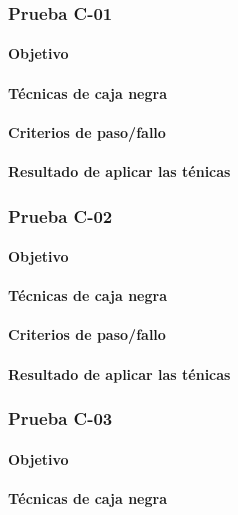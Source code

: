 \documentclass[10pt,a4paper]{article}
\begin{document}
			\subsubsection{Prueba C-01}
			\paragraph{Objetivo}
			\paragraph{Técnicas de caja negra}
			\paragraph{Criterios de paso/fallo}
			\paragraph{Resultado de aplicar las ténicas}
			\subsubsection{Prueba C-02}
			\paragraph{Objetivo}
			\paragraph{Técnicas de caja negra}
			\paragraph{Criterios de paso/fallo}
			\paragraph{Resultado de aplicar las ténicas}
			\subsubsection{Prueba C-03}
			\paragraph{Objetivo}
			\paragraph{Técnicas de caja negra}
\end{document}
